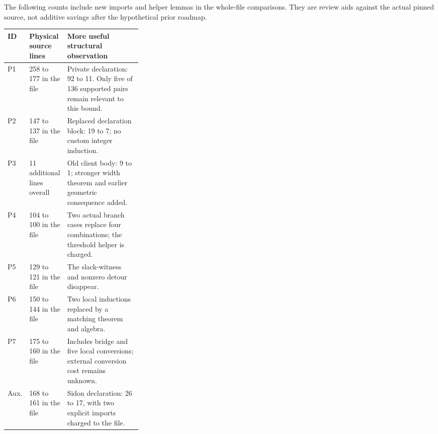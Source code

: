 The following counts include new imports and helper lemmas in the whole-file
comparisons. They are review aids against the actual pinned source, not
additive savings after the hypothetical prior roadmap.

\begin{tabularx}{\linewidth}{@{}p{0.07\linewidth}p{0.24\linewidth}X@{}}
\toprule ID & Physical source lines & More useful structural observation \\
\midrule
P1 & 258 to 177 in the file & Private declaration: 92 to 11. Only five of 136 supported pairs remain relevant to this bound. \\
P2 & 147 to 137 in the file & Replaced declaration block: 19 to 7; no custom integer induction. \\
P3 & 11 additional lines overall & Old client body: 9 to 1; stronger width theorem and earlier geometric consequence added. \\
P4 & 104 to 100 in the file & Two actual branch cases replace four combinations; the threshold helper is charged. \\
P5 & 129 to 121 in the file & The slack-witness and nonzero detour disappear. \\
P6 & 150 to 144 in the file & Two local inductions replaced by a matching theorem and algebra. \\
P7 & 175 to 160 in the file & Includes bridge and five local conversions; external conversion cost remains unknown. \\
Aux. & 168 to 161 in the file & Sidon declaration: 26 to 17, with two explicit imports charged to the file. \\
\bottomrule
\end{tabularx}
